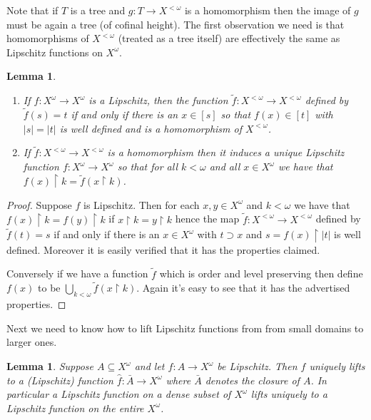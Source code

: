 \documentclass[leqno,11pt]{amsart}
\newtheorem{lemma}[theorem]{Lemma}
\theoremstyle{definition}
\theoremstyle{remark}
\def\hook{\upharpoonright}
\begin{document}
Note that if $T$ is a tree and $g:T \to X^{<\omega}$ is a homomorphism then the image of $g$ must be again a tree (of cofinal height). The first observation we need is that homomorphisms of $X^{<\omega}$ (treated as a tree itself) are effectively the same as Lipschitz functions on $X^\omega$.
\begin{lemma} \label{homomorphism representation}
\begin{enumerate}
\item
 If $f:X^\omega \to X^\omega$ is a Lipschitz, then the function $\tilde{f}:X^{<\omega} \to X^{<\omega}$ defined by $\tilde{f}(s) = t$ if and only if there is an $x \in [s]$ so that $f(x) \in [t]$ with $|s| = |t|$ is well defined and is a homomorphism of $X^{<\omega}$. 
\item
If $\tilde{f}:X^{< \omega} \to X^{< \omega}$ is a homomorphism then it induces a unique Lipschitz function $f:X^\omega \to X^\omega$ so that for all $k<\omega$ and all $x \in X^\omega$ we have that $f(x) \hook k = \tilde{f}(x \hook k)$. 
\end{enumerate}
\end{lemma}

\begin{proof}
 Suppose $f$ is Lipschitz. Then for each $x, y \in X^\omega$ and $k < \omega$ we have that $f(x) \hook k = f(y) \hook k$ if $x \hook k = y \hook k$ hence the map $\tilde{f}:X^{<\omega} \to X^{<\omega}$ defined by $\tilde{f}(t) = s$ if and only if there is an $x \in X^\omega$ with $t \supset x$ and $s = f(x) \hook |t|$ is well defined. Moreover it is easily verified that it has the properties claimed.

    Conversely if we have a function $\tilde{f}$ which is order and level preserving then define $f(x)$ to be $\bigcup_{k < \omega} \tilde{f}(x \hook k)$. Again it's easy to see that it has the advertised properties. 
\end{proof}

Next we need to know how to lift Lipschitz functions from from small domains to larger ones.

\begin{lemma}
    Suppose $A \subseteq X^\omega$ and let $f:A \to X^\omega$ be Lipschitz. Then $f$ uniquely lifts to a (Lipschitz) function $\hat{f}:\bar{A} \to X^\omega$ where $\bar{A}$ denotes the closure of $A$. In particular a Lipschitz function on a dense subset of $X^\omega$ lifts uniquely to a Lipschitz function on the entire $X^\omega$.  \label{lifting lipschitz}
\end{lemma}
\end{document}
